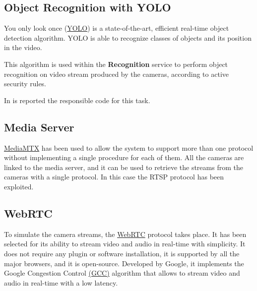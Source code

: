 \documentclass{scrartcl}
\begin{document}
    

    \subsection{Object Recognition with YOLO}
    You only look once (\href{https://pjreddie.com/darknet/yolo}{YOLO}) is a state-of-the-art, efficient real-time object detection algorithm.
    YOLO is able to recognize classes of objects and its position in the video.

    This algorithm is used within the \textbf{Recognition} service to perform object recognition on video stream produced by the cameras, according to active security rules.

    In  is reported the responsible code for this task.
    


    \subsection{Media Server}
    \href{https://github.com/bluenviron/mediamtx}{MediaMTX} has been used to allow the system to support more than one protocol without implementing a single procedure for each of them.
    All the cameras are linked to the media server, and it can be used to retrieve the streams from the cameras with a single protocol.
    In this case the RTSP protocol has been exploited.

    \subsection{WebRTC}
    To simulate the camera streams, the \href{https://webrtc.org/}{WebRTC} protocol takes place.
    It has been selected for its ability to stream video and audio in real-time with simplicity.
    It does not require any plugin or software installation, it is supported by all the major browsers, and it is open-source.
    Developed by Google, it implements the Google Congestion Control \href{https://www.researchgate.net/publication/316684665_Congestion_Control_for_Real-Time_Communication}{(GCC)} algorithm that allows to stream video and audio in real-time with a low latency.
\end{document}
